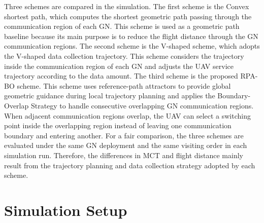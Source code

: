 \documentclass[12pt]{ksthesis}
\begin{document}
\begin{thesis}
{    Three schemes are compared in the simulation. The first scheme is the Convex shortest path, which computes the shortest geometric path passing through the communication region of each GN. This scheme is used as a geometric path baseline because its main purpose is to reduce the flight distance through the GN communication regions. The second scheme is the V-shaped scheme, which adopts the V-shaped data collection trajectory. This scheme considers the trajectory inside the communication region of each GN and adjusts the UAV service trajectory according to the data amount. The third scheme is the proposed RPA-BO scheme. This scheme uses reference-path attractors to provide global geometric guidance during local trajectory planning and applies the Boundary-Overlap Strategy to handle consecutive overlapping GN communication regions. When adjacent communication regions overlap, the UAV can select a switching point inside the overlapping region instead of leaving one communication boundary and entering another. For a fair comparison, the three schemes are evaluated under the same GN deployment and the same visiting order in each simulation run. Therefore, the differences in MCT and flight distance mainly result from the trajectory planning and data collection strategy adopted by each scheme.

\section{Simulation Setup}

}
\end{thesis}
\end{document}
